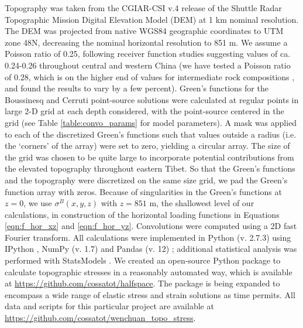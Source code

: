 \documentclass[twocolumn,jgrga]{AGUTeX}
\begin{document}
\begin{article}
Topography was taken from the CGIAR-CSI v.4 release
\citep{jarvis2008srtm} of the Shuttle Radar Topographic Mission
\citep{farr2007srtm} Digital Elevation Model (DEM) at 1 km nominal
resolution. The DEM was projected from native WGS84 geographic
coordinates to UTM zone 48N, decreasing the nominal horizontal
resolution to 851 m. We assume a Poisson ratio of 0.25, following
receiver function studies suggesting values of ca. 0.24-0.26 throughout
central and western China \citep{chen2010receiverfn} (we have tested a Poisson
ratio of 0.28, which is on the higher end of values for intermediate rock
compositions \citep{zandt_ammons1995}, and found the results to vary by a few
percent). Green's
functions for the Boussinesq and Cerruti point-source solutions were
calculated at regular points in large 2-D grid at each depth
considered, with the point-source centered in the grid (see Table
\ref{table:convo_params} for model parameters). A mask was applied to
each of the discretized Green's functions such that values outside a 
radius (i.e. the `corners' of the array) were set to zero, yielding a
circular array. The size of the
grid was chosen to be quite large to incorporate potential contributions
from the elevated topography throughout eastern Tibet. So that the
Green's functions and the topography were discretized on the same size
grid, we pad the Green's function array with zeros. Because of
singularities in the Green's functions at $z=0$, we use
$\sigma^B(x,y,z)$ with $z=851$ m, the shallowest level of our
calculations, in construction of the horizontal loading functions in
Equations \ref{eqn:f_hor_xz} and \ref{eqn:f_hor_yz}. Convolutions were
computed using a 2D fast Fourier transform. All calculations were
implemented in Python (v. 2.7.3) using IPython \citep{perez2007ipython},
NumPy (v. 1.7) \citep{oliphant2007numpy} and Pandas (v. 12)
\citep{mckinney2010}; additional statistical analysis was performed with
StatsModels \citep{seabold2010}. We created an open-source Python package
to calculate topographic stresses in a reasonably automated way, which
is available at \url{https://github.com/cossatot/halfspace}. The package
is being expanded to encompass a wide range of elastic stress and strain
solutions as time permits. All data and scripts for this particular
project are available at
\url{https://github.com/cossatot/wenchuan_topo_stress}.


\end{article}
\end{document}
